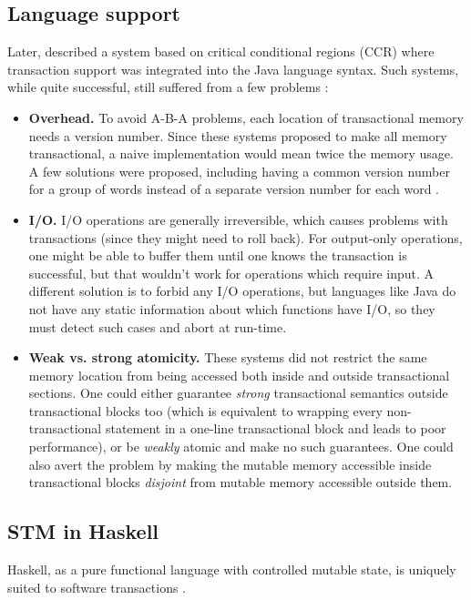 \documentclass[a4paper]{acmtrans2m}
\begin{document}
\subsection{Language support}

Later,  described a system based on critical conditional
regions (CCR) \cite{Hoare:1972} where transaction support was integrated into
the Java language syntax. Such systems, while quite successful, still suffered
from a few problems \cite{Harris:2005,Duffy:2010}:

\begin{itemize}
\item \textbf{Overhead.} To avoid A-B-A problems, each location of transactional
  memory needs a version number. Since these systems proposed to make all memory
  transactional, a naive implementation would mean twice the memory usage. A few
  solutions were proposed, including having a common version number for a group
  of words instead of a separate version number for each word
  \cite{Harris:2003}.
\item \textbf{I/O.} I/O operations are generally irreversible, which causes
  problems with transactions (since they might need to roll back). For
  output-only operations, one might be able to buffer them until one knows the
  transaction is successful, but that wouldn't work for operations which require
  input. A different solution is to forbid any I/O operations, but languages
  like Java do not have any static information about which functions have I/O,
  so they must detect such cases and abort at run-time.
\item \textbf{Weak vs. strong atomicity.} These systems did not restrict the
  same memory location from being accessed both inside and outside transactional
  sections. One could either guarantee \textit{strong} transactional semantics
  outside transactional blocks too (which is equivalent to wrapping every
  non-transactional statement in a one-line transactional block and leads to
  poor performance), or be \textit{weakly} atomic and make no such
  guarantees. One could also avert the problem by making the mutable memory
  accessible inside transactional blocks \textit{disjoint} from mutable memory
  accessible outside them.
\end{itemize}

\subsection{STM in Haskell}

Haskell, as a pure functional language with controlled mutable state, is
uniquely suited to software transactions \cite{Harris:2005}.



\end{document}
